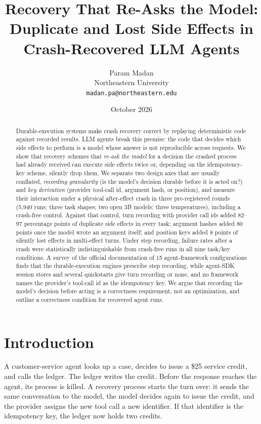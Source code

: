 \documentclass[11pt]{article}
\title{Recovery That Re-Asks the Model:\\
Duplicate and Lost Side Effects in Crash-Recovered LLM Agents}
\author{Param Madan\\Northeastern University\\\texttt{madan.pa@northeastern.edu}}
\date{October 2026}
\begin{document}
\maketitle

\begin{abstract}
Durable-execution systems make crash recovery correct by replaying
deterministic code against recorded results. LLM agents break this premise:
the code that decides which side effects to perform is a model whose answer
is not reproducible across requests. We show that recovery schemes that
\emph{re-ask the model} for a decision the crashed process had already
received can execute side effects twice or, depending on the
idempotency-key scheme, silently drop them. We separate two design axes that
are usually conflated, \emph{recording granularity} (is the model's decision
durable before it is acted on?) and \emph{key derivation} (provider tool-call
id, argument hash, or position), and measure their interaction under a
physical after-effect crash in three pre-registered rounds (5,940 runs; three
task shapes; two open 3B models; three temperatures), including a crash-free
control. Against that control, turn recording with provider call ids added
82--97 percentage points of duplicate side effects in every task; argument
hashes added 80 points once the model wrote an argument itself; and position
keys added 8 points of silently lost effects in multi-effect turns. Under
step recording, failure rates after a crash were statistically
indistinguishable from crash-free runs in all nine task/key conditions. A survey of the official
documentation of 15 agent-framework configurations finds that the
durable-execution engines prescribe step recording, while agent-SDK session
stores and several quickstarts give turn recording or none, and no framework
names the provider's tool-call id as the idempotency key. We argue that recording the model's decision before
acting is a correctness requirement, not an optimization, and outline a
correctness condition for recovered agent runs.
\end{abstract}

\section{Introduction}

A customer-service agent looks up a case, decides to issue a \$25 service
credit, and calls the ledger. The ledger writes the credit. Before the
response reaches the agent, its process is killed. A recovery process starts
the turn over: it sends the same conversation to the model, the model decides
again to issue the credit, and the provider assigns the new tool call a new
identifier. If that identifier is the idempotency key, the ledger now holds
two credits.
\end{document}
